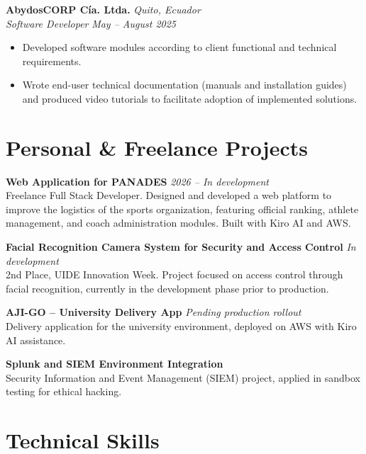 \documentclass[10.5pt]{article}
\begin{document}
\vspace{0.3em}
\textbf{AbydosCORP Cía. Ltda.} \hfill \textit{Quito, Ecuador}\\
\textit{Software Developer} \hfill \textit{May -- August 2025}
\begin{itemize}
    \item Developed software modules according to client functional and technical requirements.
    \item Wrote end-user technical documentation (manuals and installation guides) and produced video tutorials to facilitate adoption of implemented solutions.
\end{itemize}

\section*{Personal \& Freelance Projects}

\textbf{Web Application for PANADES} \hfill \textit{2026 -- In development}\\
Freelance Full Stack Developer. Designed and developed a web platform to improve the logistics of the sports organization, featuring official ranking, athlete management, and coach administration modules. Built with Kiro AI and AWS.

\vspace{0.25em}
\textbf{Facial Recognition Camera System for Security and Access Control} \hfill \textit{In development}\\
2nd Place, UIDE Innovation Week. Project focused on access control through facial recognition, currently in the development phase prior to production.

\vspace{0.25em}
\textbf{AJI-GO -- University Delivery App} \hfill \textit{Pending production rollout}\\
Delivery application for the university environment, deployed on AWS with Kiro AI assistance.

\vspace{0.25em}
\textbf{Splunk and SIEM Environment Integration}\\
Security Information and Event Management (SIEM) project, applied in sandbox testing for ethical hacking.

\section*{Technical Skills}
\end{document}
